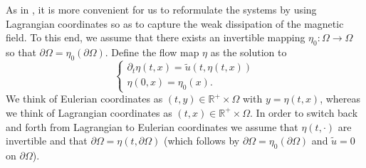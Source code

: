 \documentclass[a4paper,reqno,11pt]{amsart}
\numberwithin{equation}{section}
\begin{document}
As in \cite{W,LXZ,XZ}, it is more convenient for us to reformulate the systems by using Lagrangian coordinates so as to capture the weak dissipation of the magnetic field. To this end, we assume that there exists an invertible mapping $
\eta_{0} :\Omega \rightarrow
\Omega
$
so that $\partial\Omega=\eta_{0}(\partial\Omega)
$. Define the flow map
$\eta$ as the solution to
\begin{equation}
\begin{cases}
\partial_t\eta(t,x)=\tilde u(t,\eta(t,x))
\\
\eta(0,x)=\eta_{0}(x).
\end{cases}
\end{equation}
We think of Eulerian coordinates as $(t,y)\in \mathbb{R}^+\times\Omega$ with $y =
\eta(t,x)$, whereas we think of Lagrangian coordinates as
$(t,x)\in \mathbb{R}^+\times\Omega$. In order to switch back and
forth from Lagrangian to Eulerian coordinates we assume that $\eta(t,\cdot)$ are invertible and that $\partial\Omega=\eta(t,\partial\Omega)
$ (which follows by $\partial\Omega=\eta_{0}(\partial\Omega)
$ and $\tilde u=0$ on ${\partial}\Omega$).
\end{document}
